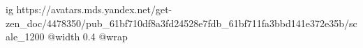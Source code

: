  
 
 
 
 

\ifcmt
  ig https://avatars.mds.yandex.net/get-zen_doc/4478350/pub_61bf710df8a3fd24528e7fdb_61bf711fa3bbd141e372e35b/scale_1200
  @width 0.4
  @wrap 
\fi
